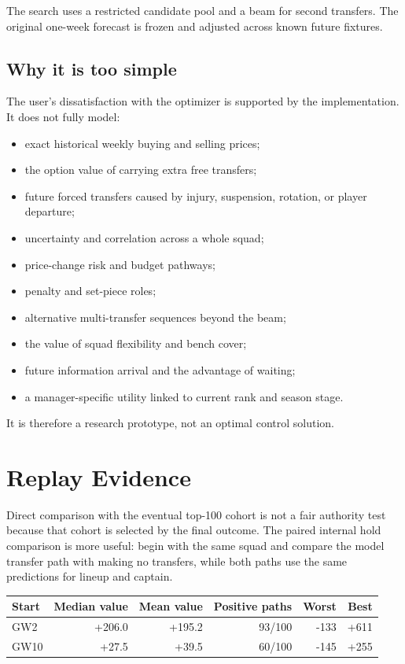 \documentclass[11pt,a4paper]{article}
\begin{document}
The search uses a restricted candidate pool and a beam for second transfers. The original one-week forecast is frozen and adjusted across known future fixtures.

\subsection{Why it is too simple}

The user's dissatisfaction with the optimizer is supported by the implementation. It does not fully model:

\begin{itemize}
  \item exact historical weekly buying and selling prices;
  \item the option value of carrying extra free transfers;
  \item future forced transfers caused by injury, suspension, rotation, or player departure;
  \item uncertainty and correlation across a whole squad;
  \item price-change risk and budget pathways;
  \item penalty and set-piece roles;
  \item alternative multi-transfer sequences beyond the beam;
  \item the value of squad flexibility and bench cover;
  \item future information arrival and the advantage of waiting;
  \item a manager-specific utility linked to current rank and season stage.
\end{itemize}

It is therefore a research prototype, not an optimal control solution.

\section{Replay Evidence}

Direct comparison with the eventual top-100 cohort is not a fair authority test because that cohort is selected by the final outcome. The paired internal hold comparison is more useful: begin with the same squad and compare the model transfer path with making no transfers, while both paths use the same predictions for lineup and captain.

\begin{center}
\begin{tabular}{lrrrrr}
\toprule
Start & Median value & Mean value & Positive paths & Worst & Best\\
\midrule
GW2 & +206.0 & +195.2 & 93/100 & -133 & +611\\
GW10 & +27.5 & +39.5 & 60/100 & -145 & +255\\
\bottomrule
\end{tabular}
\end{center}
\end{document}
